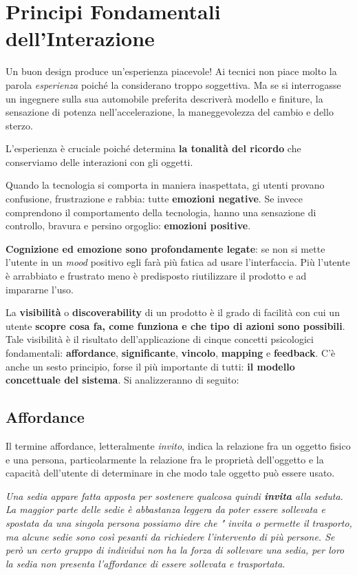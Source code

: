 \chapter{Principi Fondamentali dell'Interazione}
Un buon design produce un'esperienza piacevole! Ai tecnici non piace molto la parola \textit{esperienza} poiché la considerano troppo soggettiva. Ma se si interrogasse un ingegnere sulla sua automobile preferita descriverà modello e finiture, la sensazione di potenza nell'accelerazione, la maneggevolezza del cambio e dello sterzo.

L'esperienza è cruciale poiché determina \textbf{la tonalità del ricordo} che conserviamo delle interazioni con gli oggetti.

Quando la tecnologia si comporta in maniera inaspettata, gi utenti provano confusione, frustrazione e rabbia: tutte \textbf{emozioni negative}. Se invece comprendono il comportamento della tecnologia, hanno una sensazione di controllo, bravura e persino orgoglio: \textbf{emozioni positive}.

\textbf{Cognizione ed emozione sono profondamente legate}: se non si mette l'utente in un \textit{mood} positivo egli farà più fatica ad usare l'interfaccia. Più l'utente è arrabbiato e frustrato meno è predisposto riutilizzare il prodotto e ad impararne l'uso.

La \textbf{visibilità} o \textbf{discoverability} di un prodotto è il grado di facilità con cui un utente \textbf{scopre cosa fa, come funziona e che tipo di azioni sono possibili}. Tale visibilità è il risultato dell'applicazione di cinque concetti psicologici fondamentali: \textbf{affordance}, \textbf{significante}, \textbf{vincolo}, \textbf{mapping} e \textbf{feedback}. C'è anche un sesto principio, forse il più importante di tutti: \textbf{il modello concettuale del sistema}. Si analizzeranno di seguito:

\section{Affordance}
Il termine affordance, letteralmente \textit{invito}, indica la relazione fra un oggetto fisico e una persona, particolarmente la relazione fra le proprietà dell'oggetto e la capacità dell'utente di determinare in che modo tale oggetto può essere usato.

\textit{Una sedia appare fatta apposta per sostenere qualcosa quindi \textbf{invita} alla seduta. La maggior parte delle sedie è abbastanza leggera da poter essere sollevata e spostata da una singola persona possiamo dire che "
	invita o permette il trasporto, ma alcune sedie sono così pesanti da richiedere l'intervento di più persone. Se però un certo gruppo di individui non ha la forza di sollevare una sedia, per loro la sedia non presenta l'affordance di essere sollevata e trasportata}.

